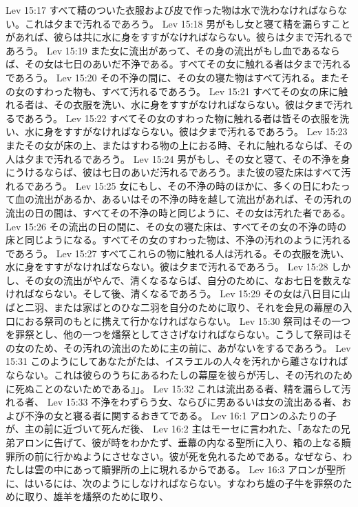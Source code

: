 Lev 15:17  すべて精のついた衣服および皮で作った物は水で洗わなければならない。これは夕まで汚れるであろう。
Lev 15:18  男がもし女と寝て精を漏らすことがあれば、彼らは共に水に身をすすがなければならない。彼らは夕まで汚れるであろう。
Lev 15:19  また女に流出があって、その身の流出がもし血であるならば、その女は七日のあいだ不浄である。すべてその女に触れる者は夕まで汚れるであろう。
Lev 15:20  その不浄の間に、その女の寝た物はすべて汚れる。またその女のすわった物も、すべて汚れるであろう。
Lev 15:21  すべてその女の床に触れる者は、その衣服を洗い、水に身をすすがなければならない。彼は夕まで汚れるであろう。
Lev 15:22  すべてその女のすわった物に触れる者は皆その衣服を洗い、水に身をすすがなければならない。彼は夕まで汚れるであろう。
Lev 15:23  またその女が床の上、またはすわる物の上におる時、それに触れるならば、その人は夕まで汚れるであろう。
Lev 15:24  男がもし、その女と寝て、その不浄を身にうけるならば、彼は七日のあいだ汚れるであろう。また彼の寝た床はすべて汚れるであろう。
Lev 15:25  女にもし、その不浄の時のほかに、多くの日にわたって血の流出があるか、あるいはその不浄の時を越して流出があれば、その汚れの流出の日の間は、すべてその不浄の時と同じように、その女は汚れた者である。
Lev 15:26  その流出の日の間に、その女の寝た床は、すべてその女の不浄の時の床と同じようになる。すべてその女のすわった物は、不浄の汚れのように汚れるであろう。
Lev 15:27  すべてこれらの物に触れる人は汚れる。その衣服を洗い、水に身をすすがなければならない。彼は夕まで汚れるであろう。
Lev 15:28  しかし、その女の流出がやんで、清くなるならば、自分のために、なお七日を数えなければならない。そして後、清くなるであろう。
Lev 15:29  その女は八日目に山ばと二羽、または家ばとのひな二羽を自分のために取り、それを会見の幕屋の入口におる祭司のもとに携えて行かなければならない。
Lev 15:30  祭司はその一つを罪祭とし、他の一つを燔祭としてささげなければならない。こうして祭司はその女のため、その汚れの流出のために主の前に、あがないをするであろう。
Lev 15:31  このようにしてあなたがたは、イスラエルの人々を汚れから離さなければならない。これは彼らのうちにあるわたしの幕屋を彼らが汚し、その汚れのために死ぬことのないためである』」。
Lev 15:32  これは流出ある者、精を漏らして汚れる者、
Lev 15:33  不浄をわずらう女、ならびに男あるいは女の流出ある者、および不浄の女と寝る者に関するおきてである。
Lev 16:1  アロンのふたりの子が、主の前に近づいて死んだ後、
Lev 16:2  主はモーセに言われた、「あなたの兄弟アロンに告げて、彼が時をわかたず、垂幕の内なる聖所に入り、箱の上なる贖罪所の前に行かぬようにさせなさい。彼が死を免れるためである。なぜなら、わたしは雲の中にあって贖罪所の上に現れるからである。
Lev 16:3  アロンが聖所に、はいるには、次のようにしなければならない。すなわち雄の子牛を罪祭のために取り、雄羊を燔祭のために取り、
